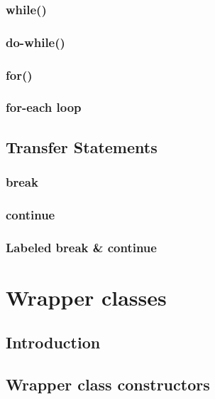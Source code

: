 \documentclass[14pt,fleqn]{extbook} %
\begin{document}
\subsection{while()}

\subsection{do-while()}

\subsection{for()}

\subsection{for-each loop}

\section{Transfer Statements}

\subsection{break}

\subsection{continue}

\subsection{Labeled break \& continue}



\chapter{Wrapper classes}
\section{Introduction}

\section{Wrapper class constructors}

\end{document}
